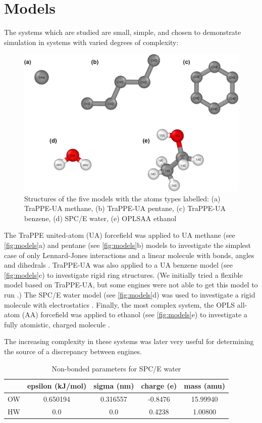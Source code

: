 \section{Models}
The systems which are studied are small, simple, and chosen to demonstrate simulation in systems with varied degrees of complexity:
\begin{figure}[h!]
    \centering
    \includegraphics[width=\linewidth]{figures/rep_study/models.png}
    \caption{Structures of the five models with the atoms types labelled: (a) TraPPE-UA methane, (b) TraPPE-UA pentane, (c) TraPPE-UA benzene, (d) SPC/E water, (e) OPLSAA ethanol}\label{fig:models}
\end{figure}
The TraPPE united-atom (UA) forcefield was applied to UA methane (see \autoref{fig:models}a) and pentane (see \autoref{fig:models}b) models to investigate the simplest case of only Lennard-Jones interactions and a linear molecule with bonds, angles and dihedrals \citep{Martin1998}.
TraPPE-UA was also applied to a UA benzene model (see \autoref{fig:models}c) to investigate rigid ring structures.
(We initially tried a flexible model based on TraPPE-UA, but some engines were not able to get this model to run \citep{Yiannourakou2019}.)
The SPC/E water model (see \autoref{fig:models}d) was used to investigate a rigid molecule with electrostatics \citep{Berendsen1987a}.
Finally, the most complex system, the OPLS all-atom (AA) forcefield was applied to ethanol (see \autoref{fig:models}e) to investigate a fully atomistic, charged molecule \citep{Jorgensen1988}.

The increasing complexity in these systems was later very useful for determining the source of a discrepancy between engines.

\begin{table}
\caption{Non-bonded parameters for SPC/E water} \label{tab:water}
\centering
\begin{tabular}{lcccc}
   & epsilon (kJ/mol) & sigma (nm) & charge (e) & mass (amu) \\ \hline
OW & 0.650194         & 0.316557   & -0.8476    &  15.99940  \\ 
HW & 0.0              & 0.0        &  0.4238    &  1.00800   \\
\end{tabular}
\end{table}

